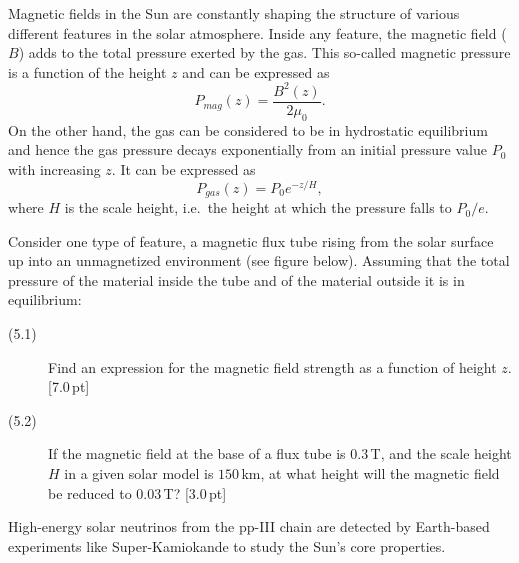 Magnetic fields in the Sun are constantly shaping the structure of various
different features in the solar atmosphere. Inside any feature, the magnetic
field ($B$) adds to the total pressure exerted by the gas. This so-called
magnetic pressure is a function of the height $z$ and can be expressed as
\[ P_{mag}(z) = \frac{B^2(z)}{2\mu_0}. \]
On the other hand, the gas can be considered to be in hydrostatic equilibrium
and hence the gas pressure decays exponentially from an initial pressure value
$P_0$ with increasing $z$. It can be expressed as
\[ P_{gas}(z) = P_0 e^{-z/H}, \]
where $H$ is the scale height, i.e.\ the height at which the pressure falls to
$P_0/e$.

Consider one type of feature, a magnetic flux tube rising from the solar surface
up into an unmagnetized environment (see figure below). Assuming that the total
pressure of the material inside the tube and of the material outside it is in
equilibrium:

\begin{description}
\item[(5.1)] Find an expression for the magnetic field strength as a function of
  height $z$. \hfill[7.0\,pt]
\item[(5.2)] If the magnetic field at the base of a flux tube is $0.3$\,T, and
  the scale height $H$ in a given solar model is $150$\,km, at what height will
  the magnetic field be reduced to $0.03$\,T? \hfill[3.0\,pt]
\end{description}


High-energy solar neutrinos from the pp-III chain are detected by Earth-based
experiments like Super-Kamiokande to study the Sun's core properties.

